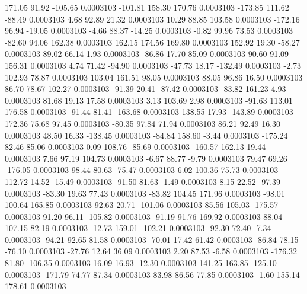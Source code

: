       171.05       91.92     -105.65     0.0003103
     -101.81      158.30      170.76     0.0003103
     -173.85      111.62      -88.49     0.0003103
        4.68       92.89       21.32     0.0003103
       10.29       88.85      103.58     0.0003103
     -172.16       96.94      -19.05     0.0003103
       -4.66       88.37      -14.25     0.0003103
       -0.82       99.96       73.53     0.0003103
      -82.60       94.06      162.38     0.0003103
      162.15      174.56      169.80     0.0003103
      152.92       19.30      -58.27     0.0003103
       89.02       66.14        1.93     0.0003103
      -86.86       17.70       85.09     0.0003103
       90.60       91.09      156.31     0.0003103
        4.74       71.42      -94.90     0.0003103
      -47.73       18.17     -132.49     0.0003103
       -2.73      102.93       78.87     0.0003103
      103.04      161.51       98.05     0.0003103
       88.05       96.86       16.50     0.0003103
       86.70       78.67      102.27     0.0003103
      -91.39       20.41      -87.42     0.0003103
      -83.82      161.23        4.93     0.0003103
       81.68       19.13       17.58     0.0003103
        3.13      103.69        2.98     0.0003103
      -91.63      113.01      176.58     0.0003103
      -91.44       81.41     -163.68     0.0003103
      138.55       17.93     -143.89     0.0003103
      172.36       75.68       97.45     0.0003103
      -80.35       97.84       71.94     0.0003103
       86.21       92.49       16.30     0.0003103
       48.50       16.33     -138.45     0.0003103
      -84.84      158.60       -3.44     0.0003103
     -175.24       82.46       85.06     0.0003103
        0.09      108.76      -85.69     0.0003103
     -160.57      162.13       19.44     0.0003103
        7.66       97.19      104.73     0.0003103
       -6.67       88.77       -9.79     0.0003103
       79.47       69.26     -176.05     0.0003103
       98.44       80.63      -75.47     0.0003103
        6.02      100.36       75.73     0.0003103
      112.72       14.52      -15.49     0.0003103
      -91.50       81.63       -1.49     0.0003103
        8.15       22.52      -97.39     0.0003103
      -83.30       19.63       77.43     0.0003103
      -83.82      104.45      171.96     0.0003103
      -98.01      100.64      165.85     0.0003103
       92.63       20.71     -101.06     0.0003103
       85.56      105.03     -175.57     0.0003103
       91.20       96.11     -105.82     0.0003103
      -91.19       91.76      169.92     0.0003103
       88.04      107.15       82.19     0.0003103
      -12.73      159.01     -102.21     0.0003103
      -92.30       72.40       -7.34     0.0003103
      -94.21       92.65       81.58     0.0003103
      -70.01       17.42       61.42     0.0003103
      -86.84       78.15      -76.10     0.0003103
      -27.76       12.64       36.09     0.0003103
        2.20       87.53       -6.58     0.0003103
     -176.32       81.80     -106.35     0.0003103
       16.09       16.93      -12.30     0.0003103
      141.25      163.85     -125.10     0.0003103
     -171.79       74.77       87.34     0.0003103
       83.98       86.56       77.85     0.0003103
       -1.60      155.14      178.61     0.0003103
